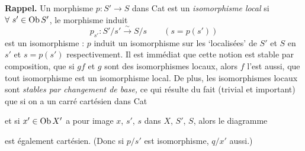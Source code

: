\textbf{Rappel.} Un morphisme $p : S' \longrightarrow S$ dans Cat est un \textit{isomorphisme local} si $\forall\ s' \in \operatorname{Ob} S'$, le morphisme induit
\[
p_{s'} : S'/s' \xrightarrow{\sim} S/s \qquad (s = p(s'))
\]
est un isomorphisme : $p$ induit un isomorphisme sur les ‘localisées’ de $S'$ et $S$ en $s'$ et $s = p(s')$ respectivement. Il est immédiat que cette notion est stable par composition, que si $gf$ et $g$ sont des isomorphismes locaux, alors $f$ l'est aussi, que tout isomorphisme est un isomorphisme local. De plus, les isomorphismes locaux sont \textit{stables par changement de base,} ce qui résulte du fait (trivial et important) que si on a un carré cartésien dans Cat

\begin{center}
\end{center}

et si $x' \in \operatorname{Ob} X'$ a pour image $x$, $s'$, $s$ dans $X$, $S'$, $S$, alors le diagramme

\begin{center}
\end{center}

est également cartésien. (Donc si $p/s'$ est isomorphisme, $q/x'$ aussi.)

